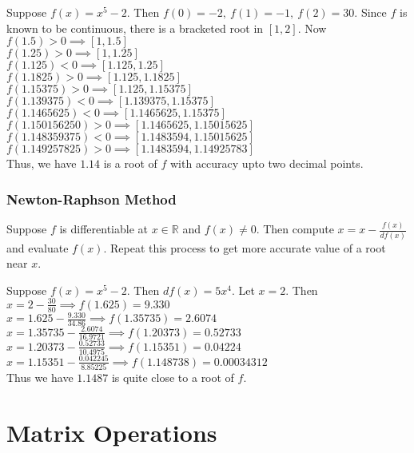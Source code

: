 \begin{remark}
	Suppose $f(x) = x^5 - 2$. Then $f(0) = -2,\ f(1) = -1,\ f(2) = 30$. Since $f$ is known to be continuous, there is a bracketed root in $[1,2]$. Now $f(1.5) > 0 \implies [1,1.5]$\\
	$f(1.25) > 0 \implies [1,1.25]$\\
	$f(1.125) < 0 \implies [1.125,1.25]$\\
	$f(1.1825)>0 \implies [1.125,1.1825]$\\
	$f(1.15375)>0 \implies [1.125,1.15375]$\\
	$f(1.139375) < 0 \implies [1.139375,1.15375]$\\
	$f(1.1465625) < 0 \implies [1.1465625,1.15375]$\\
	$f(1.150156250) > 0 \implies [1.1465625,1.15015625]$\\
	$f(1.148359375) < 0 \implies [1.1483594,1.15015625]$\\
	$f(1.149257825) > 0 \implies [1.1483594,1.14925783]$\\
	
	Thus, we have $1.14$ is a root of $f$ with accuracy upto two decimal points.
\end{remark}

\subsection{Newton-Raphson Method}
	Suppose $f$ is differentiable at $x \in \mathbb{R}$ and $f(x) \ne 0$. Then compute $x = x - \frac{f(x)}{df(x)}$ and evaluate $f(x)$. Repeat this process to get more accurate value of a root near $x$.

\begin{remark}
	Suppose $f(x) = x^5 - 2$. Then $df(x) = 5x^4$. Let $x = 2$. Then\\
	$x = 2 - \frac{30}{80} \implies f(1.625) = 9.330 $\\
	$x = 1.625 - \frac{9.330}{34.86} \implies f(1.35735) = 2.6074$ \\
	$x = 1.35735 - \frac{2.6074}{16.9721} \implies f(1.20373) = 0.52733$ \\
	$x = 1.20373 - \frac{0.52733}{10.4975} \implies f(1.15351) = 0.04224$ \\
	$x = 1.15351 - \frac{0.042245}{8.85225} \implies f(1.148738) = 0.00034312 $\\

	Thus we have $1.1487$ is quite close to a root of $f$.
\end{remark}

\chapter{Matrix Operations}

